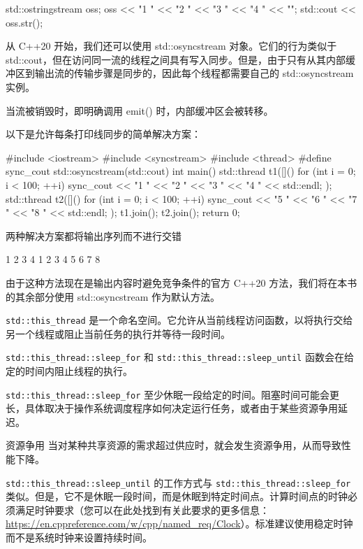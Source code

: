 \begin{cpp}
std::ostringstream oss;
oss << "1 " << "2 " << "3 " << "4 " << "\n";
std::cout << oss.str();
\end{cpp}

从 C++20 开始，我们还可以使用 std::osyncstream 对象。它们的行为类似于 std::cout，但在访问同一流的线程之间具有写入同步。但是，由于只有从其内部缓冲区到输出流的传输步骤是同步的，因此每个线程都需要自己的 std::osyncstream 实例。

当流被销毁时，即明确调用 emit() 时，内部缓冲区会被转移。

以下是允许每条打印线同步的简单解决方案：

\begin{cpp}
#include <iostream>
#include <syncstream>
#include <thread>
#define sync_cout std::osyncstream(std::cout)
int main() {
    std::thread t1([]() {
        for (int i = 0; i < 100; ++i) {
            sync_cout << "1 " << "2 " << "3 " << "4 "
            << std::endl;
        }
    });
    std::thread t2([]() {
        for (int i = 0; i < 100; ++i) {
            sync_cout << "5 " << "6 " << "7 " << "8 "
            << std::endl;
        }
    });
    t1.join();
    t2.join();
    return 0;
}
\end{cpp}

两种解决方案都将输出序列而不进行交错

\begin{shell}
1 2 3 4
1 2 3 4
5 6 7 8
\end{shell}

由于这种方法现在是输出内容时避免竞争条件的官方 C++20 方法，我们将在本书的其余部分使用 std::osyncstream 作为默认方法。


\verb|std::this_thread| 是一个命名空间。它允许从当前线程访问函数，以将执行交给另一个线程或阻止当前任务的执行并等待一段时间。

\verb|std::this_thread::sleep_for| 和 \verb|std::this_thread::sleep_until| 函数会在给定的时间内阻止线程的执行。

\verb|std::this_thread::sleep_for| 至少休眠一段给定的时间。阻塞时间可能会更长，具体取决于操作系统调度程序如何决定运行任务，或者由于某些资源争用延迟。

\begin{myTip}{资源争用}
当对某种共享资源的需求超过供应时，就会发生资源争用，从而导致性能下降。
\end{myTip}

\verb|std::this_thread::sleep_until| 的工作方式与 \verb|std::this_thread::sleep_for| 类似。但是，它不是休眠一段时间，而是休眠到特定时间点。计算时间点的时钟必须满足时钟要求（您可以在此处找到有关此要求的更多信息： \url{https://en.cppreference.com/w/cpp/named_req/Clock}）。标准建议使用稳定时钟而不是系统时钟来设置持续时间。

